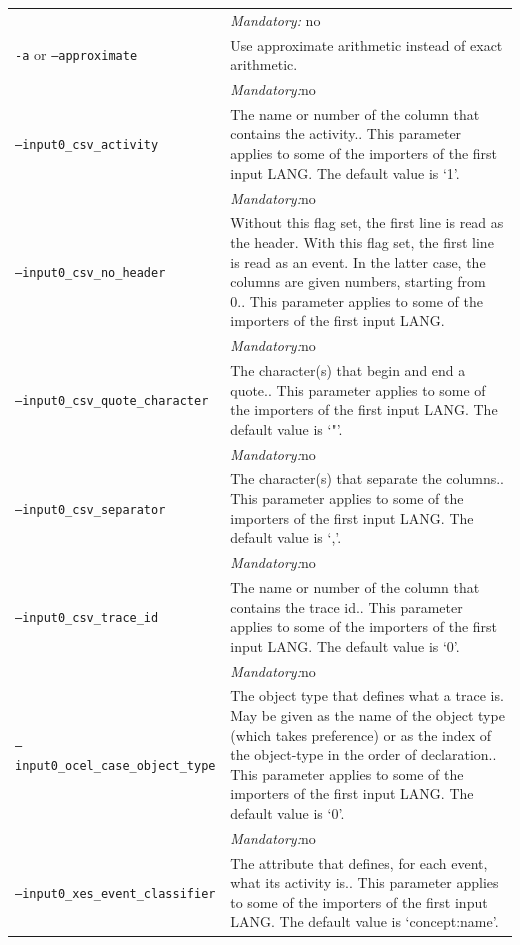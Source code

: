 {\begin{tabularx}{\linewidth}{lX}
&\textit{Mandatory:} \quad no\\
\texttt{-a} or \texttt{--approximate} & Use approximate arithmetic instead of exact arithmetic.\\
&\textit{Mandatory:}\quad no\\
\texttt{--input0\_csv\_activity} & The name or number of the column that contains the activity.. This parameter applies to some of the importers of the first input LANG. The default value is `1'.\\
&\textit{Mandatory:}\quad no\\
\texttt{--input0\_csv\_no\_header} & Without this flag set, the first line is read as the header. 
    With this flag set, the first line is read as an event. In the latter case, the columns are given numbers, starting from 0.. This parameter applies to some of the importers of the first input LANG. \\
&\textit{Mandatory:}\quad no\\
\texttt{--input0\_csv\_quote\_character} & The character(s) that begin and end a quote.. This parameter applies to some of the importers of the first input LANG. The default value is `"'.\\
&\textit{Mandatory:}\quad no\\
\texttt{--input0\_csv\_separator} & The character(s) that separate the columns.. This parameter applies to some of the importers of the first input LANG. The default value is `,'.\\
&\textit{Mandatory:}\quad no\\
\texttt{--input0\_csv\_trace\_id} & The name or number of the column that contains the trace id.. This parameter applies to some of the importers of the first input LANG. The default value is `0'.\\
&\textit{Mandatory:}\quad no\\
\texttt{--input0\_ocel\_case\_object\_type} & The object type that defines what a trace is. May be given as the name of the object type (which takes preference) or as the index of the object-type in the order of declaration.. This parameter applies to some of the importers of the first input LANG. The default value is `0'.\\
&\textit{Mandatory:}\quad no\\
\texttt{--input0\_xes\_event\_classifier} & The attribute that defines, for each event, what its activity is.. This parameter applies to some of the importers of the first input LANG. The default value is `concept:name'.\\

\end{tabularx}}
